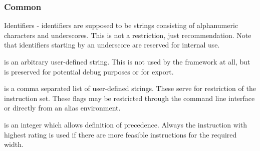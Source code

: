 \subsubsection{Common}
\begin{description}
  \item Identifiers - identifiers are supposed to be strings consisting of alphanumeric characters and underscores. This is not a restriction, just recommendation. Note that identifiers starting by an underscore are reserved for internal use.
  \item {} is an arbitrary user-defined string. This is not used by the framework at all, but is preserved for potential debug purposes or for export.
  \item {} is a comma separated list of user-defined strings. These serve for restriction of the instruction set. These flags may be restricted through the command line interface or directly from an alias environment.
  \item {} is an integer which allows definition of precedence. Always the instruction with highest rating is used if there are more feasible instructions for the required width.
\end{description}

